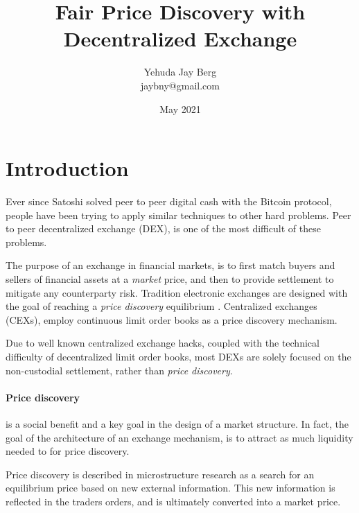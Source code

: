 \documentclass[12pt]{article}
\title{Fair Price Discovery with Decentralized Exchange}
\author{Yehuda Jay Berg \\jaybny@gmail.com}
\date{May 2021}
\begin{document}
\parindent 0cm
\parskip   6pt
\maketitle




\begin{abstract}
\end{abstract}

\section{Introduction}
Ever since Satoshi solved peer to peer digital cash with the Bitcoin protocol, people have been trying to apply similar techniques to other hard problems. Peer to peer decentralized exchange (DEX), is one of the most difficult of these problems. 

The purpose of an exchange in financial markets, is to first match buyers and sellers of financial assets at a \emph{market} price, and then to provide settlement to mitigate any counterparty risk. Tradition electronic exchanges are designed with the goal of reaching a  \emph{price discovery} equilibrium \cite{francioni_schwartz_2017}. Centralized exchanges (CEXs), employ continuous limit order books as a price discovery mechanism. 

Due to well known centralized exchange hacks, coupled with the technical difficulty of decentralized limit order books, most DEXs are solely focused on the non-custodial settlement, rather than \emph{price discovery}. 

\paragraph*{Price discovery} is a social benefit and a key goal in the design of a market structure. In fact, the goal of the architecture of an exchange mechanism, is to attract as much liquidity needed to for price discovery.  \cite{francioni_schwartz_2017}

Price discovery is described in microstructure research as a search for an equilibrium price based on new external information. This new information is reflected in the traders orders, and is ultimately converted into a market price. \citep{RePEc:nbr:nberwo:6257}
\end{document}
